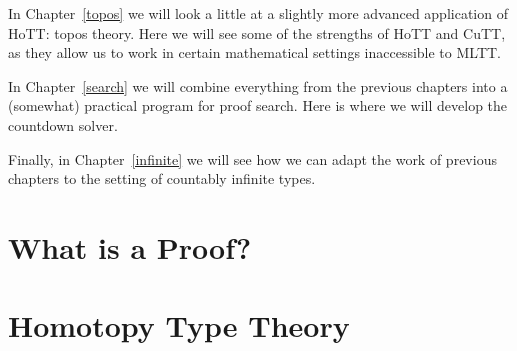 In Chapter~\ref{topos} we will look a little at a slightly more advanced
application of HoTT: topos theory.
Here we will see some of the strengths of HoTT and CuTT, as they allow us to
work in certain mathematical settings inaccessible to MLTT.

In Chapter~\ref{search} we will combine everything from the previous chapters
into a (somewhat) practical program for proof search.
Here is where we will develop the countdown solver.

Finally, in Chapter~\ref{infinite} we will see how we can adapt the work of
previous chapters to the setting of countably infinite types.
\section{What is a Proof?}
\section{Homotopy Type Theory}



